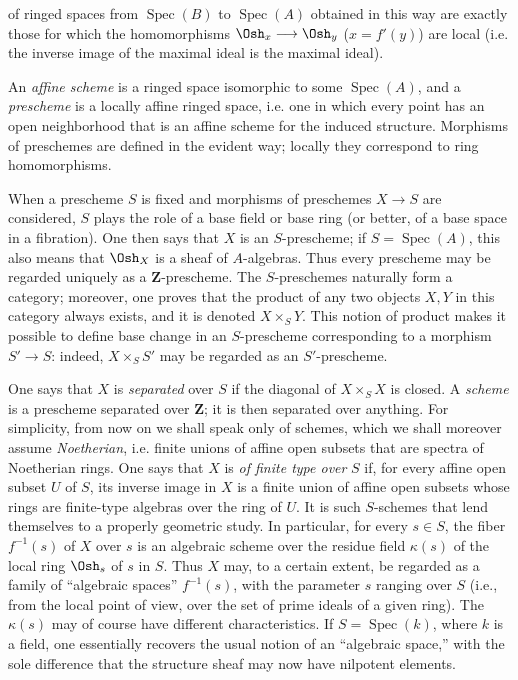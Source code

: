 of ringed spaces from $\operatorname{Spec}(B)$ to
$\operatorname{Spec}(A)$ obtained in this way are exactly those for which the
homomorphisms $\Osh_x\longrightarrow\Osh_y$ ($x=f'(y)$) are local (i.e. the
inverse image of the maximal ideal is the maximal ideal).

An \emph{affine scheme} is a ringed space isomorphic to some
$\operatorname{Spec}(A)$, and a \emph{prescheme} is a locally affine ringed
space, i.e. one in which every point has an open neighborhood that is an affine
scheme for the induced structure. Morphisms of preschemes are defined in the
evident way; locally they correspond to ring homomorphisms.

When a prescheme $S$ is fixed and morphisms of preschemes
$X\longrightarrow S$ are considered, $S$ plays the role of a base field or
base ring (or better, of a base space in a fibration). One then says that $X$
is an $S$-prescheme; if $S=\operatorname{Spec}(A)$, this also means that
$\Osh_X$ is a sheaf of $A$-algebras. Thus every prescheme may be regarded
uniquely as a $\mathbf Z$-prescheme. The $S$-preschemes naturally form a
category; moreover, one proves that the product of any two objects $X,Y$ in
this category always exists, and it is denoted $X\times_S Y$. This notion of
product makes it possible to define base change in an $S$-prescheme
corresponding to a morphism $S'\longrightarrow S$: indeed, $X\times_S S'$ may
be regarded as an $S'$-prescheme.

One says that $X$ is \emph{separated} over $S$ if the diagonal of
$X\times_S X$ is closed. A \emph{scheme} is a prescheme separated over
$\mathbf Z$; it is then separated over anything. For simplicity, from now on
we shall speak only of schemes, which we shall moreover assume
\emph{Noetherian}, i.e. finite unions of affine open subsets that are spectra
of Noetherian rings. One says that $X$ is \emph{of finite type over} $S$ if,
for every affine open subset $U$ of $S$, its inverse image in $X$ is a finite
union of affine open subsets whose rings are finite-type algebras over the ring
of $U$. It is such $S$-schemes that lend themselves to a properly geometric
study. In particular, for every $s\in S$, the fiber $f^{-1}(s)$ of $X$ over
$s$ is an algebraic scheme over the residue field $\kappa(s)$ of the local ring
$\Osh_s$ of $s$ in $S$. Thus $X$ may, to a certain extent, be regarded as a
family of “algebraic spaces” $f^{-1}(s)$, with the parameter $s$ ranging over
$S$ (i.e., from the local point of view, over the set of prime ideals of a
given ring). The $\kappa(s)$ may of course have different characteristics. If
$S=\operatorname{Spec}(k)$, where $k$ is a field, one essentially recovers the
usual notion of an “algebraic space,” with the sole difference that the
structure sheaf may now have nilpotent elements.

